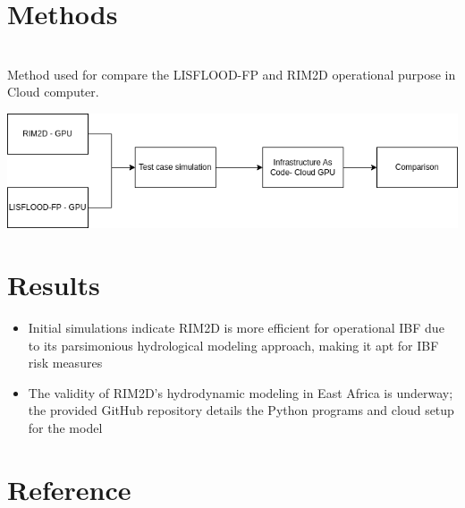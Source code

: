 \documentclass[a0paper,fleqn]{betterposter}
\begin{document}
{\begin{itemize}
		\end{itemize}
		
		\section{Methods}
		\\ Method used for compare the LISFLOOD-FP and RIM2D operational purpose in Cloud computer.
		\begin{center}
			\includegraphics[width=\textwidth]{img/rim2d.png}
		\end{center}
		
	    \section{Results}
		\begin{itemize}
			\item Initial simulations indicate RIM2D is more efficient for operational IBF due to its parsimonious hydrological modeling approach, making it apt for IBF risk measures
			\item The validity of RIM2D's hydrodynamic modeling in East Africa is underway; the provided GitHub repository details the Python programs and cloud setup for the model
	
		\end{itemize}
		\section{Reference}
		\renewcommand{\bibsection}{}                                                                                                               
		
}
\end{document}
